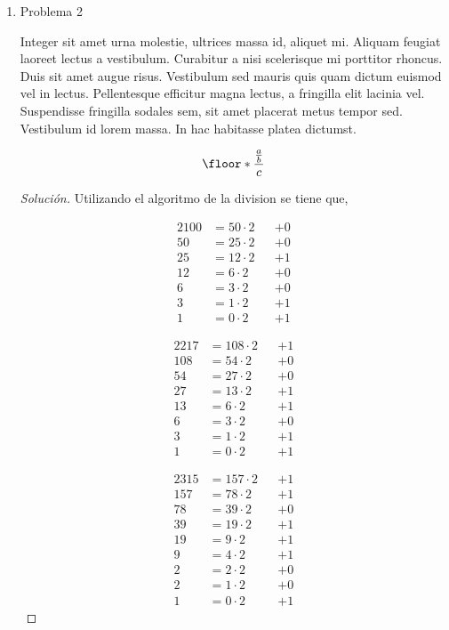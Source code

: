 \documentclass[spanish,mexico]{article}
\numberwithin{equation}{section}
\theoremstyle{definition}
\theoremstyle{remark}
\newenvironment{solution}{\begin{proof}[Solución]}{\end{proof}}
\DeclarePairedDelimiter{\floor}\lfloor\rfloor
\begin{document}
\begin{enumerate}[wide]
\item Problema 2

    Integer sit amet urna molestie, ultrices massa id, aliquet mi. Aliquam feugiat laoreet lectus a vestibulum. Curabitur a nisi scelerisque mi porttitor rhoncus. Duis sit amet augue risus. Vestibulum sed mauris quis quam dictum euismod vel in lectus. Pellentesque efficitur magna lectus, a fringilla elit lacinia vel. Suspendisse fringilla sodales sem, sit amet placerat metus tempor sed. Vestibulum id lorem massa. In hac habitasse platea dictumst. 
    
    \[
        \floor*{\frac{\frac{a}{b}}{c}}
    \]

\begin{solution}
    Utilizando el algoritmo de la division se tiene que,
    
    \begin{minipage}{.3\linewidth}
      \begin{alignat*}{2}
        100 &=50\cdot2&&+0\\
        50  &=25\cdot2&&+0\\
        25  &=12\cdot2&&+1\\
        12  &=6 \cdot2&&+0\\
        6   &=3 \cdot2&&+0\\
        3   &=1 \cdot2&&+1\\
        1   &=0 \cdot2&&+1
      \end{alignat*}
    \end{minipage}
    \begin{minipage}{.3\linewidth}
      \begin{alignat*}{2}
        217 &=108\cdot2&&+1\\
        108 &=54 \cdot2&&+0\\
        54  &=27 \cdot2&&+0\\
        27  &=13 \cdot2&&+1\\
        13  &=6  \cdot2&&+1\\
        6   &=3  \cdot2&&+0\\
        3   &=1  \cdot2&&+1\\
        1   &=0  \cdot2&&+1
      \end{alignat*}
    \end{minipage}
    \begin{minipage}{.3\linewidth}
      \begin{alignat*}{2}
        315 &=157 \cdot2&&+1\\
        157 &=78  \cdot2&&+1\\
        78  &=39  \cdot2&&+0\\
        39  &=19  \cdot2&&+1\\
        19  &=9   \cdot2&&+1\\
        9   &=4   \cdot2&&+1\\
        2   &=2   \cdot2&&+0\\
        2   &=1   \cdot2&&+0\\
        1   &=0   \cdot2&&+1
      \end{alignat*}
    \end{minipage}
    

\end{solution}
\end{enumerate}
\end{document}

